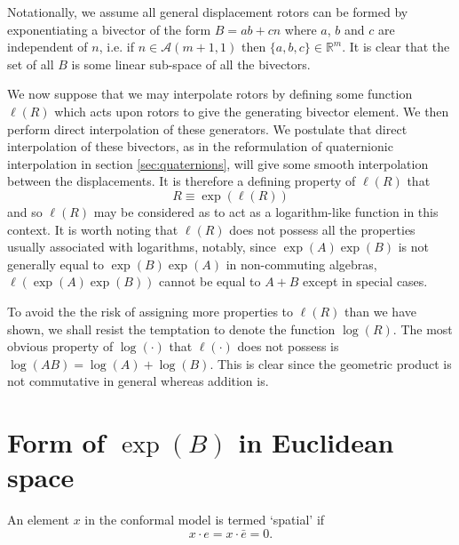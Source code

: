 Notationally, we assume all general displacement rotors can be formed by
exponentiating a bivector of the form $B = ab + cn$ where $a$, $b$ and $c$ are
independent of $n$, i.e. if $n \in \mathcal{A}(m+1,1)$ then $\{a,b,c\} \in
\mathbb{R}^m$.  It is clear that the set of all $B$ is some linear sub-space
of all the bivectors.

We now suppose that we may interpolate rotors by defining some function
$\ell(R)$ which acts upon rotors to give the generating bivector element. We
then perform direct interpolation of these generators.  We postulate that
direct interpolation of these bivectors, as in the reformulation of
quaternionic interpolation in section \ref{sec:quaternions}, will give some
smooth interpolation between the displacements.  It is therefore a defining
property of $\ell(R)$ that
\begin{equation}
R \equiv \exp(\ell(R))
\end{equation}
and so $\ell(R)$ may be considered as to act as a logarithm-like function in
this context.  It is worth noting that $\ell(R)$ does not possess all the
properties usually associated with logarithms, notably, since
$\exp(A)\exp(B)$ is not generally equal to $\exp(B)\exp(A)$ in non-commuting
algebras, $\ell(\exp(A)\exp(B))$ cannot be equal to $A + B$ except in special
cases.

To avoid the the risk of assigning more properties to $\ell(R)$ than we have
shown, we shall resist the temptation to denote the function $\log(R)$. The
most obvious property of $\log(\cdot)$ that $\ell(\cdot)$ does not possess is
$\log(AB) = \log(A) + \log(B)$. This is clear since the geometric product is
not commutative in general whereas addition is.

\section{Form of $\exp(B)$ in Euclidean space}
\label{subsec:form}

\begin{definition}
An element $x$ in the conformal model is termed `spatial' if
\[
x \cdot e = x \cdot \bar{e} = 0.
\]
\end{definition}

